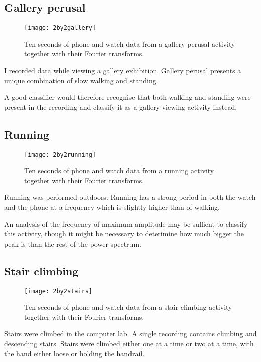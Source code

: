     \subsection{Gallery perusal}
      \begin{figure}[!th]
        \centering
        \texttt{[image: 2by2gallery]}
        \caption{Ten seconds of phone and watch data from a gallery perusal activity together with their Fourier transforms.}
        \label{fig:2by2gallery}
      \end{figure}
      
      I recorded data while viewing a gallery exhibition. Gallery perusal presents a unique combination of slow walking and standing.
      
      A good classifier would therefore recognise that both walking and standing were present in the recording and classify it as a gallery viewing activity instead.
    \pagebreak[4]
    \subsection{Running}
      \begin{figure}[!th]
        \centering
        \texttt{[image: 2by2running]}
        \caption{Ten seconds of phone and watch data from a running activity together with their Fourier transforms.}
        \label{fig:2by2running}
      \end{figure}
      
      Running was performed outdoors. Running has a strong period in both the watch and the phone at a frequency which is slightly higher than of walking.
      
      An analysis of the frequency of maximum amplitude may be suffient to classify this activity, though it might be necessary to deterimine how much bigger the peak is than the rest of the power spectrum.
      
    \pagebreak[4]
    \subsection{Stair climbing}
      \begin{figure}[!th]
        \centering
        \texttt{[image: 2by2stairs]}
        \caption{Ten seconds of phone and watch data from a stair climbing activity together with their Fourier transforms.}
        \label{fig:2by2stairs}
      \end{figure}
      Stairs were climbed in the computer lab. A single recording contains climbing and descending stairs. Stairs were climbed either one at a time or two at a time, with the hand either loose or holding the handrail.
      
